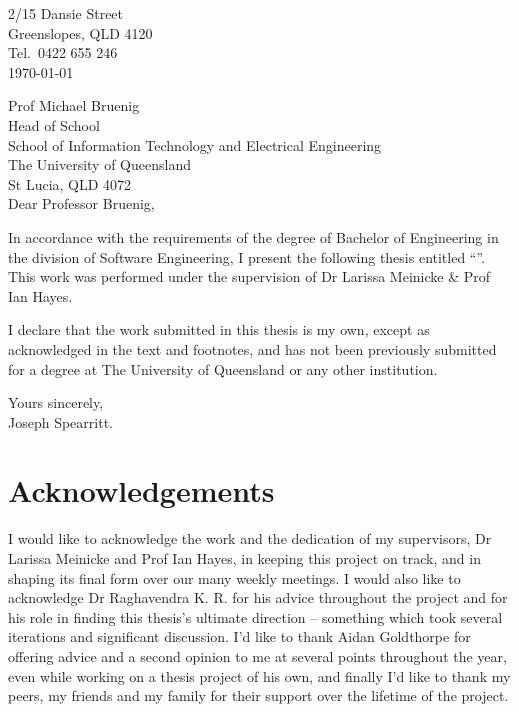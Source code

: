 
\cleardoublepage

\begin{flushright}
	2/15 Dansie Street\\
	Greenslopes, QLD 4120\\
	Tel.\ 0422 655 246\\
	\medskip
	\today
\end{flushright}
\begin{flushleft}
	Prof Michael Bruenig\\
	Head of School\\
	School of Information Technology and Electrical Engineering\\
	The University of Queensland\\
	St Lucia, QLD 4072\\
	\bigskip\bigskip
	Dear Professor Bruenig,
\end{flushleft}

In accordance with the requirements of the degree of Bachelor of Engineering in the division of Software Engineering, I present the following thesis entitled ``\thetitle''. This work was performed under the supervision of Dr Larissa Meinicke \& Prof Ian Hayes.

I declare that the work submitted in this thesis is my own, except as
acknowledged in the text and footnotes, and has not been previously
submitted for a degree at The University of Queensland or any other
institution.
\newline
\begin{flushright}
	Yours sincerely,\\
	\medskip
	$ \; $\vspace*{5mm}\\
	\medskip
	Joseph Spearritt.
\end{flushright}

\cleardoublepage

\chapter{Acknowledgements}

I would like to acknowledge the work and the dedication of my supervisors, Dr Larissa Meinicke and Prof Ian Hayes, in keeping this project on track, and in shaping its final form over our many weekly meetings. I would also like to acknowledge Dr Raghavendra K. R. for his advice throughout the project and for his role in finding this thesis's ultimate direction -- something which took several iterations and significant discussion. I'd like to thank Aidan Goldthorpe for offering advice and a second opinion to me at several points throughout the year, even while working on a thesis project of his own, and finally I'd like to thank my peers, my friends and my family for their support over the lifetime of the project.


